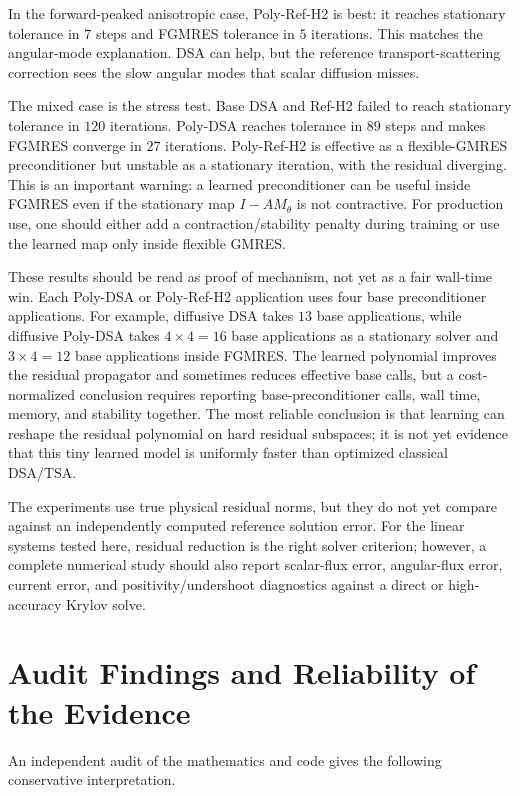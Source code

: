 \documentclass[11pt]{article}
\begin{document}
In the forward-peaked anisotropic case, Poly-Ref-H2 is best: it reaches
stationary tolerance in \(7\) steps and FGMRES tolerance in \(5\) iterations.
This matches the angular-mode explanation.  DSA can help, but the reference
transport-scattering correction sees
the slow angular modes that scalar diffusion misses.

The mixed case is the stress test.  Base DSA and Ref-H2 failed to reach
stationary tolerance in \(120\) iterations.  Poly-DSA reaches tolerance in
\(89\) steps and makes FGMRES converge in \(27\) iterations.  Poly-Ref-H2 is
effective as a flexible-GMRES preconditioner but unstable as a stationary
iteration, with the residual diverging.  This is an important warning: a
learned preconditioner can be useful inside FGMRES even if the stationary map
\(I-AM_\theta\) is not contractive.  For production use, one should either
add a contraction/stability penalty during training or use the learned map only
inside flexible GMRES.

These results should be read as proof of mechanism, not yet as a fair
wall-time win.  Each Poly-DSA or Poly-Ref-H2 application uses four base
preconditioner applications.  For example, diffusive DSA takes \(13\) base
applications, while diffusive Poly-DSA takes \(4\times4=16\) base applications
as a stationary solver and \(3\times4=12\) base applications inside FGMRES.
The learned polynomial improves the residual propagator and sometimes reduces
effective base calls, but a cost-normalized conclusion requires reporting
base-preconditioner calls, wall time, memory, and stability together.  The
most reliable conclusion is that learning can reshape the residual polynomial
on hard residual subspaces; it is not yet evidence that this tiny learned
model is uniformly faster than optimized classical DSA/TSA.

The experiments use true physical residual norms, but they do not yet compare
against an independently computed reference solution error.  For the linear
systems tested here, residual reduction is the right solver criterion; however,
a complete numerical study should also report scalar-flux error, angular-flux
error, current error, and positivity/undershoot diagnostics against a direct or
high-accuracy Krylov solve.

\section{Audit Findings and Reliability of the Evidence}

An independent audit of the mathematics and code gives the following
conservative interpretation.
\end{document}

